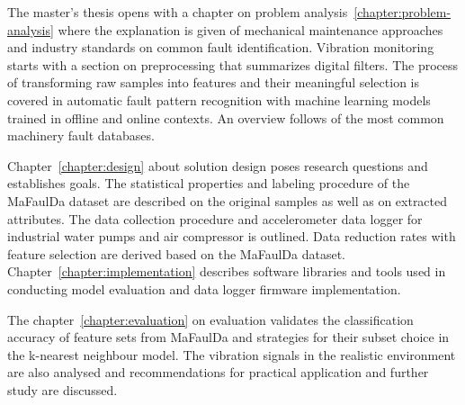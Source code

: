 The master's thesis opens with a chapter on problem analysis~\ref{chapter:problem-analysis} where the explanation is given of mechanical maintenance approaches and industry standards on common fault identification. Vibration monitoring starts with a section on preprocessing that summarizes digital filters. The process of transforming raw samples into features and their meaningful selection is covered in automatic fault pattern recognition with machine learning models trained in offline and online contexts. An overview follows of the most common machinery fault databases.

Chapter~\ref{chapter:design} about solution design poses research questions and establishes goals. The statistical properties and labeling procedure of the MaFaulDa dataset are described on the original samples as well as on extracted attributes. The data collection procedure and accelerometer data logger for industrial water pumps and air compressor is outlined. Data reduction rates with feature selection are derived based on the MaFaulDa dataset. Chapter~\ref{chapter:implementation} describes software libraries and tools used in conducting model evaluation and data logger firmware implementation.

The chapter~\ref{chapter:evaluation} on evaluation validates the classification accuracy of feature sets from MaFaulDa and strategies for their subset choice in the k-nearest neighbour model. The vibration signals in the realistic environment are also analysed and recommendations for practical application and further study are discussed.
